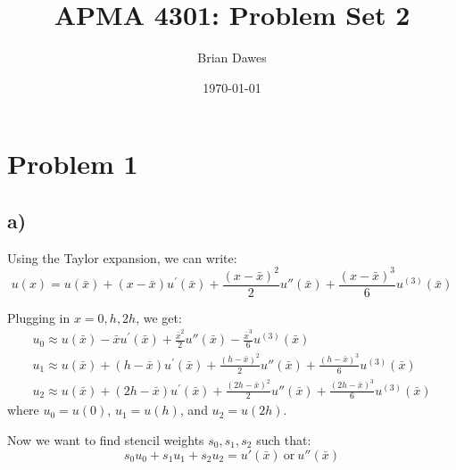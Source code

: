 \documentclass{article}
\begin{document}
\title{APMA 4301: Problem Set 2}
\author{Brian Dawes}
\date{\today}
\maketitle
\section*{Problem 1}
\subsection*{a)}
Using the Taylor expansion, we can write:
\begin{equation}
u(x) = u(\bar x)+(x-\bar x)u^\prime(\bar x)+\frac{(x-\bar x)^2}{2}u''(\bar x)+\frac{(x-\bar x)^3}{6}u^{(3)}(\bar x)
\end{equation}

Plugging in $x=0,h,2h$, we get:
\begin{eqnarray}
u_0 \approx u(\bar x)-\bar xu^\prime(\bar x)+\frac{\bar x^2}{2}u''(\bar x)-\frac{\bar x^3}{6}u^{(3)}(\bar x) \\
u_1 \approx u(\bar x)+(h-\bar x)u^\prime(\bar x)+\frac{(h-\bar x)^2}{2}u''(\bar x)+\frac{(h-\bar x)^3}{6}u^{(3)}(\bar x) \\
u_2 \approx u(\bar x)+(2h-\bar x)u^\prime(\bar x)+\frac{(2h-\bar x)^2}{2}u''(\bar x)+\frac{(2h-\bar x)^3}{6}u^{(3)}(\bar x)
\end{eqnarray}
where $u_0=u(0)$, $u_1=u(h)$, and $u_2=u(2h)$.

Now we want to find stencil weights $s_0,s_1,s_2$ such that:
\begin{equation}
s_0u_0+s_1u_1+s_2u_2=u'(\bar x)\ \mathrm{or}\ u''(\bar x)
\end{equation}
\end{document}
